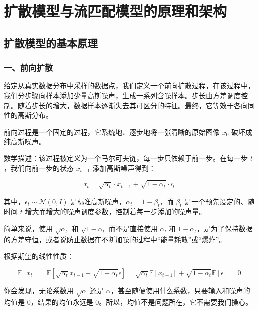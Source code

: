 \hypertarget{ux6269ux6563ux6a21ux578bux4e0eux6d41ux5339ux914dux6a21ux578bux7684ux539fux7406ux548cux67b6ux6784}{%
\chapter{扩散模型与流匹配模型的原理和架构}\label{ux6269ux6563ux6a21ux578bux4e0eux6d41ux5339ux914dux6a21ux578bux7684ux539fux7406ux548cux67b6ux6784}}

\hypertarget{ux6269ux6563ux6a21ux578bux7684ux57faux672cux539fux7406}{%
\section{扩散模型的基本原理}\label{ux6269ux6563ux6a21ux578bux7684ux57faux672cux539fux7406}}

\hypertarget{ux4e00ux524dux5411ux6269ux6563}{%
\subsection{一、前向扩散}\label{ux4e00ux524dux5411ux6269ux6563}}

给定从真实数据分布中采样的数据点，我们定义一个前向扩散过程，在该过程中，我们分步骤向样本添加少量高斯噪声，生成一系列含噪样本。步长由方差调度控制。随着步长的增大，数据样本逐渐失去其可区分的特征。最终，它等效于各向同性的高斯分布。

前向过程是一个固定的过程，它系统地、逐步地将一张清晰的原始图像 \(x_0\) 破坏成纯高斯噪声。

数学描述：该过程被定义为一个马尔可夫链，每一步只依赖于前一步。在每一步 \(t\)，我们向前一步的状态 \(x_{t-1}\) 添加高斯噪声得到：

\[
x_t = \sqrt{\alpha_t}\cdot x_{t-1} + \sqrt{1-\alpha_t}\cdot \epsilon_t
\]

其中，\(\epsilon_t \sim \mathcal{N}(0, I)\) 是标准高斯噪声，\(\alpha_t = 1-\beta_t\)，而 \(\beta_t\) 是一个预先设定的、随时间 \(t\) 增大而增大的噪声调度参数，控制着每一步添加的噪声量。

简单来说，使用 \(\sqrt{\alpha_t}\) 和 \(\sqrt{1-\alpha_t}\) 而不是直接使用 \(\alpha_t\) 和 \(1-\alpha_t\)，是为了保持数据的方差守恒，或者说防止数据在不断加噪的过程中``能量耗散''或``爆炸''。

根据期望的线性性质：

\[
\mathbb{E}[x_t]
= \mathbb{E}\left[\sqrt{\alpha_t}x_{t-1}+\sqrt{1-\alpha_t}\epsilon\right]
= \sqrt{\alpha_t}\mathbb{E}[x_{t-1}] + \sqrt{1-\alpha_t}\mathbb{E}[\epsilon]
= 0
\]

你会发现，无论系数用 \(\sqrt{\alpha}\) 还是 \(\alpha\)，甚至随便使用什么系数，只要输入和噪声的均值是 \(0\)，结果的均值永远是 \(0\)。所以，均值不是问题所在，它不需要我们操心。

